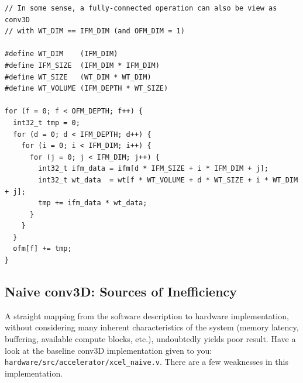 \documentclass[11pt]{article}
\begin{document}
\begin{verbatim}
// In some sense, a fully-connected operation can also be view as conv3D
// with WT_DIM == IFM_DIM (and OFM_DIM = 1)

#define WT_DIM    (IFM_DIM)
#define IFM_SIZE  (IFM_DIM * IFM_DIM)
#define WT_SIZE   (WT_DIM * WT_DIM)
#define WT_VOLUME (IFM_DEPTH * WT_SIZE)

for (f = 0; f < OFM_DEPTH; f++) {
  int32_t tmp = 0;
  for (d = 0; d < IFM_DEPTH; d++) {
    for (i = 0; i < IFM_DIM; i++) {
      for (j = 0; j < IFM_DIM; j++) {
        int32_t ifm_data = ifm[d * IFM_SIZE + i * IFM_DIM + j];
        int32_t wt_data  = wt[f * WT_VOLUME + d * WT_SIZE + i * WT_DIM + j];
        tmp += ifm_data * wt_data;
      }
    }
  }
  ofm[f] += tmp;
}

\end{verbatim}

\subsection{Naive conv3D: Sources of Inefficiency}

A straight mapping from the software description to hardware implementation, without considering many inherent characteristics of the system (memory latency, buffering, available compute blocks, etc.), undoubtedly yields poor result. Have a look at the baseline conv3D implementation given to you: \verb|hardware/src/accelerator/xcel_naive.v|. There are a few weaknesses in this implementation.
\end{document}
